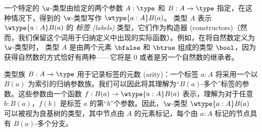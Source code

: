 一个特定的 $\w$-类型由给定的两个参数 $A : \type$ 和 $B : A \to \type$ 指定，在这种情况下，得到的 $\w$-类型写作 $\wtype{a:A} B(a)$。
类型 $A$ 表示 $\wtype{a :A} B(a)$ 的 \emph{标签 (labels)} 类型，它们作为构造器 (constructors)（然而，我们保留这个词用于归纳定义中出现的实际函数）。例如，在将自然数定义为 $\w$-类型时，%
类型 $A$ 是由两个元素 $\bfalse$ 和 $\btrue$ 组成的类型 $\bool$，因为获得自然数的方式恰好有两种——它将是 $0$ 或者是另一个自然数的继承者。

类型族 $B : A \to \type$ 用于记录标签的元数 (arity)：一个标签 $a : A$ 将采用一个以 $B(a)$ 为索引的归纳参数族。我们可以因此将其理解为“$B(a)$-多个”标签的参数。这些参数由一个函数 $f : B(a) \to \wtype{a :A} B(a)$ 表示，理解为对于任意 $b : B(a)$，$f(b)$ 是标签 $a$ 的第“$b$”个参数。因此，$\w$-类型 $\wtype{a :A} B(a)$ 可以被视为良基树的类型，其中节点由 $A$ 的元素标记，每个由 $a : A$ 标记的节点具有 $B(a)$-多个分支。

